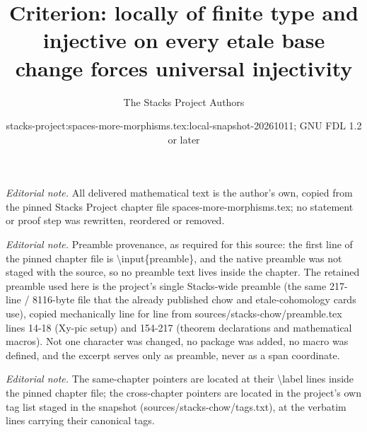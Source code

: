 \documentclass[10pt,a4paper]{amsart}
\title{Criterion: locally of finite type and injective on every etale base change forces universal injectivity}
\author{The Stacks Project Authors}
\date{stacks-project:spaces-more-morphisms.tex:local-snapshot-20261011; GNU FDL 1.2 or later}
\theoremstyle{plain}
\theoremstyle{definition}
\theoremstyle{remark}
\numberwithin{equation}{subsection}
\begin{document}
\maketitle
\noindent\textit{Editorial note.} All delivered mathematical text is the author's own, copied from the pinned Stacks Project chapter file spaces-more-morphisms.tex; no statement or proof step was rewritten, reordered or removed.\par\medskip
\noindent\textit{Editorial note.} Preamble provenance, as required for this source: the first line of the pinned chapter file is \textbackslash{}input\{preamble\}, and the native preamble was not staged with the source, so no preamble text lives inside the chapter. The retained preamble used here is the project's single Stacks-wide preamble (the same 217-line / 8116-byte file that the already published chow and etale-cohomology cards use), copied mechanically line for line from sources/stacks-chow/preamble.tex lines 14-18 (Xy-pic setup) and 154-217 (theorem declarations and mathematical macros). Not one character was changed, no package was added, no macro was defined, and the excerpt serves only as preamble, never as a span coordinate.\par\medskip
\noindent\textit{Editorial note.} The same-chapter pointers are located at their \textbackslash{}label lines inside the pinned chapter file; the cross-chapter pointers are located in the project's own tag list staged in the snapshot (sources/stacks-chow/tags.txt), at the verbatim lines carrying their canonical tags.\par\medskip
\end{document}
